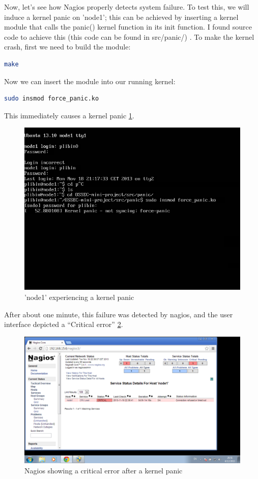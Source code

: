 \documentclass[12pt]{report}
\begin{document}
Now, let's see how Nagios properly detects system failure. To test
this, we will induce a kernel panic on 'node1'; this can be achieved
by inserting a kernel module that calls the panic() kernel function in
its init function. I found source code to achieve this (this code can
be found in src/panic/) \cite{simulate_linux_crash}.
To make the kernel crash, first we need to build the module:
\begin{lstlisting}[language=bash]
 make
\end{lstlisting} 
Now we can insert the module into our running kernel:
\begin{lstlisting}[language=bash]
 sudo insmod force_panic.ko
\end{lstlisting} 
This immediately causes a kernel panic \cref{fig:kernel_panic}.
\begin{figure}[h!]
  \caption{'node1' experiencing a kernel panic}
  \label{fig:kernel_panic}
  \centering
    \includegraphics[scale=0.4]{pics/kernel_panic.png}
\end{figure}
After about one minute, this failure was detected by nagios, and the
user interface depicted a ``Critical error'' \cref{fig:nagios_after_kernel_panic}.

\begin{figure}[h!]
  \caption{Nagios showing a critical error after a kernel panic}
  \label{fig:nagios_after_kernel_panic}
  \centering
    \includegraphics[scale=0.3]{pics/nagios_after_kernel_panic.png}
\end{figure}
\end{document}
